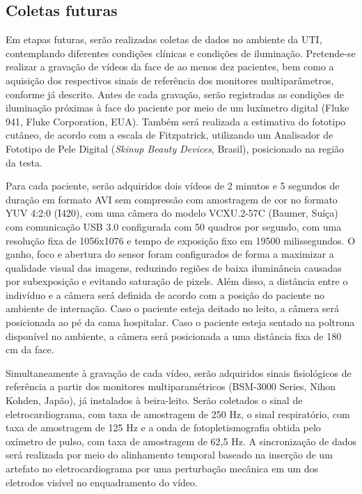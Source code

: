 \subsection{Coletas futuras}

Em etapas futuras, serão realizadas coletas de dados no ambiente da UTI, contemplando diferentes condições clínicas e condições de iluminação. Pretende-se realizar a gravação de vídeos da face de ao menos dez pacientes, bem como a aquisição dos respectivos sinais de referência dos monitores multiparâmetros, conforme já descrito. Antes de cada gravação, serão registradas as condições de iluminação próximas à face do paciente por meio de um luxímetro digital (Fluke 941, Fluke Corporation, EUA). Também será realizada a estimativa do fototipo cutâneo, de acordo com a escala de Fitzpatrick, utilizando um Analisador de Fototipo de Pele Digital (\textit{Skinup Beauty Devices}, Brasil), posicionado na região da testa. 

Para cada paciente, serão adquiridos dois vídeos de 2 minutos e 5 segundos de duração em formato AVI sem compressão com amostragem de cor no formato YUV 4:2:0 (I420), com uma câmera do modelo VCXU.2-57C (Baumer, Suíça) com comunicação USB 3.0 configurada com 50 quadros por segundo, com uma resolução fixa de 1056x1076 e tempo de exposição fixo em 19500 milissegundos. O ganho, foco e abertura do sensor foram configurados de forma a maximizar a qualidade visual das imagens, reduzindo regiões de baixa iluminância causadas por subexposição e evitando saturação de pixels. Além disso, a distância entre o indivíduo e a câmera será definida de acordo com a posição do paciente no ambiente de internação. Caso o paciente esteja deitado no leito, a câmera será posicionada ao pé da cama hospitalar. Caso o paciente esteja sentado na poltrona disponível no ambiente, a câmera será posicionada a uma distância fixa de 180 cm da face.  

Simultaneamente à gravação de cada vídeo, serão adquiridos sinais fisiológicos de referência a partir dos monitores multiparamétricos (BSM-3000 Series, Nihon Kohden, Japão), já instalados à beira-leito. Serão coletados o sinal de eletrocardiograma, com taxa de amostragem de 250 Hz, o sinal respiratório, com taxa de amostragem de 125 Hz e a onda de fotopletismografia obtida pelo oxímetro de pulso, com taxa de amostragem de 62,5 Hz. A sincronização de dados será realizada por meio do alinhamento temporal baseado na inserção de um artefato no eletrocardiograma por uma perturbação mecânica em um dos eletrodos visível no enquadramento do vídeo.

